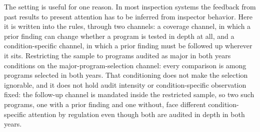 The setting is useful for one reason. In most inspection systems the feedback
from past results to present attention has to be inferred from inspector
behavior. Here it is written into the rules, through two channels: a coverage
channel, in which a prior finding can change whether a program is tested in
depth at all, and a condition-specific channel, in which a prior finding must
be followed up wherever it sits. Restricting the sample to programs audited as
major in both years conditions on the major-program-selection channel: every
comparison is among programs selected in both years. That conditioning does
not make the selection ignorable, and it does not hold audit intensity or
condition-specific observation fixed: the
follow-up channel is mandated inside the restricted sample, so two such
programs, one with a prior finding and one without, face different
condition-specific attention by regulation even though both are audited in
depth in both years.
